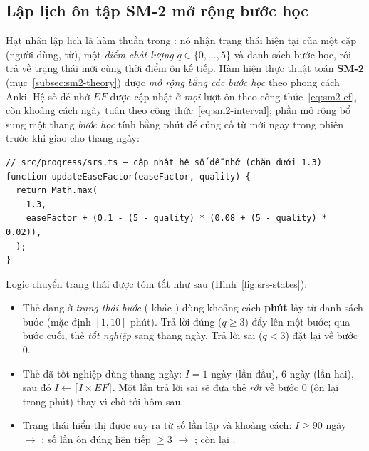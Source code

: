 \subsection{Lập lịch ôn tập SM-2 mở rộng bước học}
\label{subsec:impl-sm2}

Hạt nhân lập lịch là hàm thuần  trong :
nó nhận trạng thái hiện tại của một cặp (người dùng, từ), một
\textit{điểm chất lượng} \( q \in \{0,\dots,5\} \) và danh sách bước học, rồi
trả về trạng thái mới cùng thời điểm ôn kế tiếp. Hàm hiện thực thuật toán
\textbf{SM-2} (mục~\ref{subsec:sm2-theory}) được \textit{mở rộng bằng các bước
học} theo phong cách Anki. Hệ số dễ nhớ \( EF \) được cập nhật ở \textit{mọi}
lượt ôn theo công thức~\eqref{eq:sm2-ef}, còn khoảng cách ngày tuân theo
công thức~\eqref{eq:sm2-interval}; phần mở rộng bổ sung một thang
\textit{bước học} tính bằng phút để củng cố từ mới ngay trong phiên trước khi
giao cho thang ngày:

\begin{verbatim}
// src/progress/srs.ts — cập nhật hệ số dễ nhớ (chặn dưới 1.3)
function updateEaseFactor(easeFactor, quality) {
  return Math.max(
    1.3,
    easeFactor + (0.1 - (5 - quality) * (0.08 + (5 - quality) * 0.02)),
  );
}
\end{verbatim}

Logic chuyển trạng thái được tóm tắt như sau (Hình~\ref{fig:srs-states}):

\begin{itemize}
  \item Thẻ đang ở \textit{trạng thái bước} ( khác
        ) dùng khoảng cách \textbf{phút} lấy từ danh sách bước (mặc
        định \([1, 10]\) phút). Trả lời đúng (\( q \ge 3 \)) đẩy lên một bước;
        qua bước cuối, thẻ \textit{tốt nghiệp} sang thang ngày. Trả lời sai
        (\( q < 3 \)) đặt lại về bước 0.
  \item Thẻ đã tốt nghiệp dùng thang ngày: \( I = 1 \) ngày (lần đầu), \( 6 \)
        ngày (lần hai), sau đó \( I \leftarrow \lceil I \times EF \rceil \).
        Một lần trả lời sai sẽ đưa thẻ \textit{rớt} về bước 0 (ôn lại trong
        phút) thay vì chờ tới hôm sau.
  \item Trạng thái hiển thị được suy ra từ số lần lặp và khoảng cách:
        \( I \ge 90 \) ngày $\rightarrow$ ; số lần ôn đúng liên
        tiếp \( \ge 3 \) $\rightarrow$ ; còn lại .
\end{itemize}

